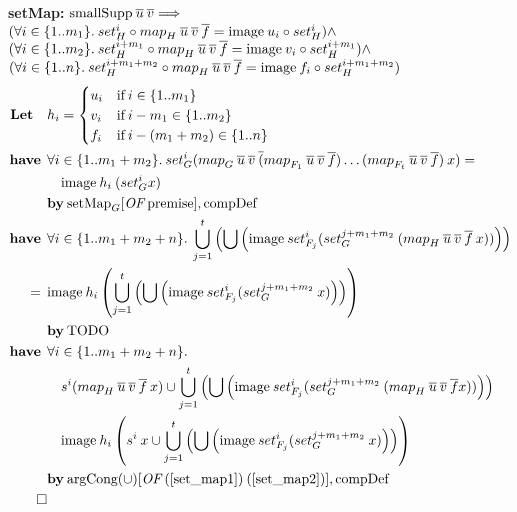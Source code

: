\textbf{setMap:} $\text{smallSupp} \: \overline{u} \: \overline{v} \Longrightarrow$ \\
\hspace*{1.7em} $(\forall i \in \{1..m_1\}. \: set_H^i \circ {map}_{H} \: \overline{u} \: \overline{v} \: \overline{f} = \text{image} \: u_i \circ set_H^i) \wedge$ \\
\hspace*{1.7em} $(\forall i \in \{1..m_2\}. \: set_H^{i+m_1} \circ {map}_{H} \: \overline{u} \: \overline{v} \: \overline{f} = \text{image} \: v_i \circ set_H^{i+m_1}) \wedge$ \\
\hspace*{1.7em} $(\forall i \in \{1..n\}. \: set_H^{i+m_1+m_2} \circ {map}_{H} \: \overline{u} \: \overline{v} \: \overline{f} = \text{image} \: f_i \circ set_H^{i+m_1+m_2})$
\begin{align}
\textbf{Let} \quad & h_i = \begin{cases}
u_i & \text{if} \: i \in \{1..m_1\} \\
v_i & \text{if} \: i - m_1 \in \{1..m_2\} \\
f_i & \text{if} \: i - (m_1+m_2) \in \{1..n\}
\end{cases} \nonumber \\
\have & \forall i \in \{1..m_1+m_2\}. \: set_G^i (\map{G}{u}{v}(\map{F_1}{u}{v}{f})\dots(\map{F_t}{u}{v}{f}) \: x) = \nonumber \\*
 & \quad \text{image} \: h_i \: (set_G^i x) \label{set_map1} \\*
 & \by \OF{\text{setMap}_G}{\text{premise}}, \text{compDef} \nonumber \\
%
\have & \forall i \in \{1..m_1+m_2+n\}. \: \bigcup_{j=1}^t \left(\bigcup \left( \text{image} \: set_{F_j}^i (set_G^{j+m_1+m_2} \: (\map{H}{u}{v}{f} \: x)) \right) \right)\nonumber \\*
=\:\: & \text{image} \: h_i \left( \bigcup_{j=1}^t \left(\bigcup \left( \text{image} \: set_{F_j}^i (set_G^{j+m_1+m_2} \: x) \right) \right) \right) \label{set_map2} \\*
 & \by \text{TODO} \nonumber \\
%
\have & \forall i \in \{1..m_1+m_2+n\}. \nonumber \\*
& \quad s^i (\map{H}{u}{v}{f} \: x) \cup \bigcup_{j=1}^t \left(\bigcup \left( \text{image} \: set_{F_j}^i (set_G^{j+m_1+m_2} \: (\map{H}{u}{v}{f} x)) \right) \right) \nonumber \\*
& \quad \text{image} \: h_i \left( s^i \: x \cup \bigcup_{j=1}^t \left(\bigcup \left( \text{image} \: set_{F_j}^i (set_G^{j+m_1+m_2} \: x) \right) \right) \right) \\*
 & \by \OF{\text{argCong}(\cup)}{(\ref{set_map1}) \: (\ref{set_map2})}, \text{compDef} \nonumber \\*
\qed \nonumber
\end{align}

